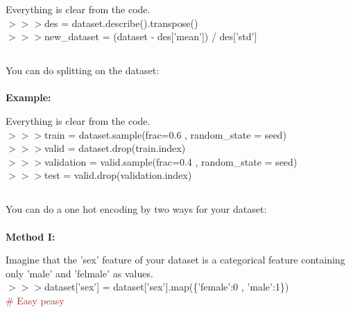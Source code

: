\documentclass[a4paper,18pt]{article}
\begin{document}
Everything is clear from the code.\\

$>>>$des = dataset.describe().transpose()\\

$>>>$new\_dataset = (dataset - des['mean']) / des['std']


\subsection{\colorbox {matgreen}{\color{white}{\large Test,Train Split}}}
You can do splitting on the dataset:\\\\
\textbf{Example:\\}

Everything is clear from the code.\\

$>>>$train = dataset.sample(frac=0.6 , random\_state = seed)\\

$>>>$valid = dataset.drop(train.index)\\

$>>>$validation = valid.sample(frac=0.4 , random\_state = seed)\\

$>>>$test = valid.drop(validation.index)\\


\subsection{\colorbox {matgreen}{\color{white}{\large One Hot Encoding}}}
You can do a one hot encoding by two ways for your dataset:\\\\
\textbf{Method I:\\}

Imagine that the 'sex' feature of your dataset is a categorical feature containing only 'male' and 'felmale' as values.\\

$>>>$dataset['sex'] = dataset['sex'].map(\{'female':0 , 'male':1\})\\

{\textcolor{brown}{\# Easy peasy}}\\
\end{document}
